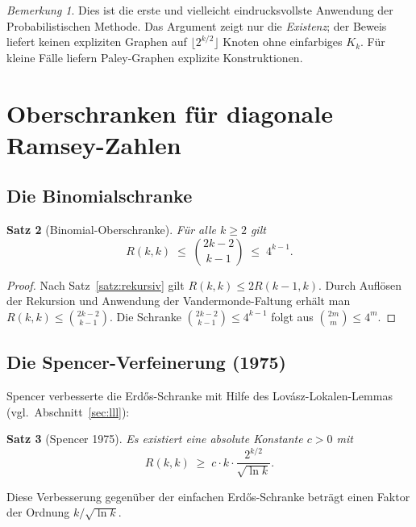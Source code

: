 \documentclass[12pt,a4paper]{amsart}
\newtheorem{theorem}{Satz}[section]
\theoremstyle{definition}
\theoremstyle{remark}
\newtheorem{remark}[theorem]{Bemerkung}
\begin{document}
\begin{remark}
Dies ist die erste und vielleicht eindrucksvollste Anwendung der Probabilistischen
Methode.  Das Argument zeigt nur die \emph{Existenz}; der Beweis liefert keinen
expliziten Graphen auf $\lfloor 2^{k/2}\rfloor$ Knoten ohne einfarbiges $K_k$.
F\"ur kleine F\"alle liefern Paley-Graphen explizite Konstruktionen.
\end{remark}

\section{Oberschranken f\"ur diagonale Ramsey-Zahlen}

\subsection{Die Binomialschranke}

\begin{theorem}[Binomial-Oberschranke]\label{satz:binomial-oben}
F\"ur alle $k \ge 2$ gilt
\[
  R(k,k) \;\le\; \binom{2k-2}{k-1} \;\le\; 4^{k-1}.
\]
\end{theorem}

\begin{proof}
Nach Satz~\ref{satz:rekursiv} gilt $R(k,k) \le 2R(k-1,k)$.  Durch Aufl\"osen
der Rekursion und Anwendung der Vandermonde-Faltung erh\"alt man
$R(k,k) \le \binom{2k-2}{k-1}$.  Die Schranke $\binom{2k-2}{k-1} \le 4^{k-1}$
folgt aus $\binom{2m}{m} \le 4^m$.
\end{proof}

\subsection{Die Spencer-Verfeinerung (1975)}

Spencer \cite{Spencer1975} verbesserte die Erd\H{o}s-Schranke mit Hilfe des
Lov\'asz-Lokalen-Lemmas (vgl.\ Abschnitt~\ref{sec:lll}):

\begin{theorem}[Spencer 1975]\label{satz:spencer}
Es existiert eine absolute Konstante $c > 0$ mit
\[
  R(k,k) \;\ge\; c \cdot k \cdot \frac{2^{k/2}}{\sqrt{\ln k}}.
\]
\end{theorem}

Diese Verbesserung gegen\"uber der einfachen Erd\H{o}s-Schranke betr\"agt einen
Faktor der Ordnung $k/\sqrt{\ln k}$.
\end{document}
